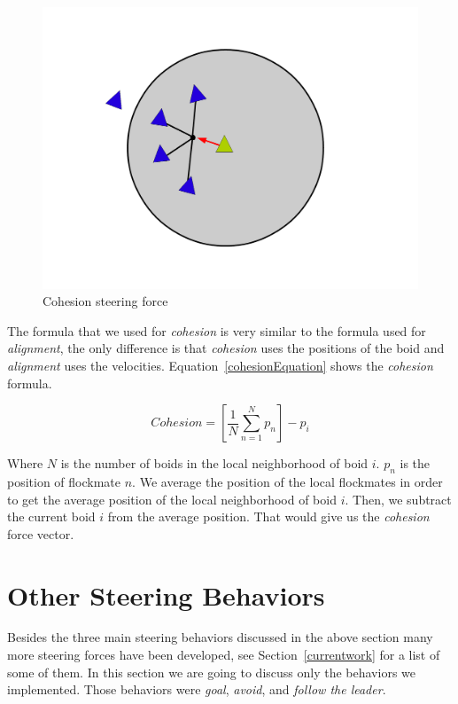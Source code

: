 \begin{figure}[htbp]
\begin{center}
\includegraphics[scale=0.3]{figures/cohesion.pdf}
\caption{Cohesion steering force}
\label{cohesionPDF}
\end{center}
\end{figure}

The formula that we used for \textit{cohesion} is very similar to the formula used for \textit{alignment}, the only difference is that \textit{cohesion} uses the positions of the boid and \textit{alignment} uses the velocities. Equation~\ref{cohesionEquation} shows the \textit{cohesion} formula.

\begin{equation}
\label{cohesionEquation}
Cohesion = \left[  \frac{1}{N} \sum_{n=1}^{N} p_n \right ] - p_i
\end{equation}

Where $N$ is the number of boids in the local neighborhood of boid $i$. $p_n$ is the position of flockmate $n$. We average the position of the local flockmates in order to get the average position of the local neighborhood of boid $i$. Then, we subtract the current boid $i$ from the average position. That would give us the \textit{cohesion} force vector.

\section{Other Steering Behaviors}
Besides the three main steering behaviors discussed in the above section many more steering forces have been developed, see Section~\ref{currentwork} for a list of some of them. In this section we are going to discuss only the behaviors we implemented. Those behaviors were \textit{goal}, \textit{avoid}, and \textit{follow the leader}.


